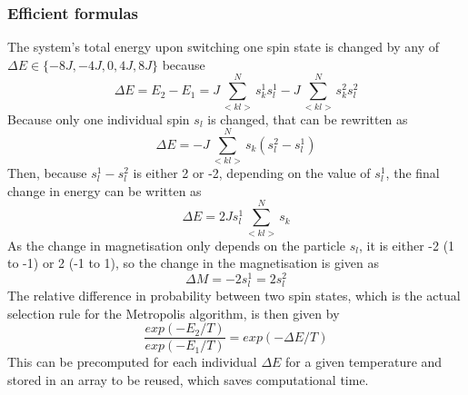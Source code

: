 \documentclass[10pt,a4paper]{article}
\begin{document}
\subsubsection{Efficient formulas}
The system's total energy upon switching one spin state is changed by any of $\Delta E \in \{-8J,-4J,0,4J,8J\}$ because 
$$\Delta E=E_2-E_1=J\sum_{<kl>}^Ns_k^1s_l^1-J\sum_{<kl>}^Ns_k^2s_l^2$$
Because only one individual spin $s_l$ is changed, that can be rewritten as 
$$\Delta E=-J\sum_{<kl>}^Ns_k(s_l^2-s_l^1)$$
Then, because $s_l^1-s_l^2$ is either 2 or -2, depending on the value of $s_l^1$, the final change in energy can be written as 
$$\Delta E=2Js_l^1\sum_{<kl>}^Ns_k$$
As the change in magnetisation only depends on the particle $s_l$, it is either -2 (1 to -1) or 2 (-1 to 1), so the change in the magnetisation is given as 
$$\Delta M=-2s_l^1=2s_l^2$$
The relative difference in probability between two spin states, which is the actual selection rule for the Metropolis algorithm, is then given by  
$$\frac{exp(-E_2/T)}{exp(-E_1/T)}=exp(-\Delta E/T)$$
This can be precomputed for each individual $\Delta E$ for a given temperature and stored in an array to be reused, which saves computational time. 
\end{document}
